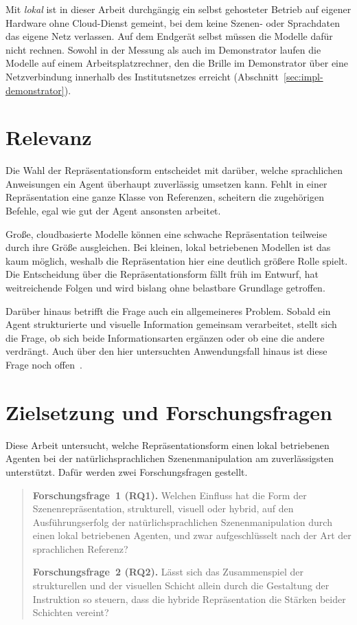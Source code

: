 Mit \emph{lokal} ist in dieser Arbeit durchgängig ein selbst gehosteter Betrieb auf eigener Hardware ohne Cloud-Dienst gemeint, bei dem keine Szenen- oder Sprachdaten das eigene Netz verlassen.
Auf dem Endgerät selbst müssen die Modelle dafür nicht rechnen.
Sowohl in der Messung als auch im Demonstrator laufen die Modelle auf einem Arbeitsplatzrechner, den die Brille im Demonstrator über eine Netzverbindung innerhalb des Institutsnetzes erreicht (Abschnitt~\ref{sec:impl-demonstrator}).


\section{Relevanz}
\label{sec:ein-relevanz}

Die Wahl der Repräsentationsform entscheidet mit darüber, welche sprachlichen Anweisungen ein Agent überhaupt zuverlässig umsetzen kann.
Fehlt in einer Repräsentation eine ganze Klasse von Referenzen, scheitern die zugehörigen Befehle, egal wie gut der Agent ansonsten arbeitet.

Große, cloudbasierte Modelle können eine schwache Repräsentation teilweise durch ihre Größe ausgleichen.
Bei kleinen, lokal betriebenen Modellen ist das kaum möglich, weshalb die Repräsentation hier eine deutlich größere Rolle spielt.
Die Entscheidung über die Repräsentationsform fällt früh im Entwurf, hat weitreichende Folgen und wird bislang ohne belastbare Grundlage getroffen.

Darüber hinaus betrifft die Frage auch ein allgemeineres Problem.
Sobald ein Agent strukturierte und visuelle Information gemeinsam verarbeitet, stellt sich die Frage, ob sich beide Informationsarten ergänzen oder ob eine die andere verdrängt.
Auch über den hier untersuchten Anwendungsfall hinaus ist diese Frage noch offen~\cite{deng2025, wu2025}.


\section{Zielsetzung und Forschungsfragen}
\label{sec:ein-ziele}

Diese Arbeit untersucht, welche Repräsentationsform einen lokal betriebenen Agenten bei der natürlichsprachlichen Szenenmanipulation am zuverlässigsten unterstützt.
Dafür werden zwei Forschungsfragen gestellt.

\begin{quote}
\textbf{Forschungsfrage~1 (RQ1).}
Welchen Einfluss hat die Form der Szenenrepräsentation, strukturell, visuell oder hybrid, auf den Ausführungserfolg der natürlichsprachlichen Szenenmanipulation durch einen lokal betriebenen Agenten, und zwar aufgeschlüsselt nach der Art der sprachlichen Referenz?

\vspace{6pt}
\textbf{Forschungsfrage~2 (RQ2).}
Lässt sich das Zusammenspiel der strukturellen und der visuellen Schicht allein durch die Gestaltung der Instruktion so steuern, dass die hybride Repräsentation die Stärken beider Schichten vereint?
\end{quote}

